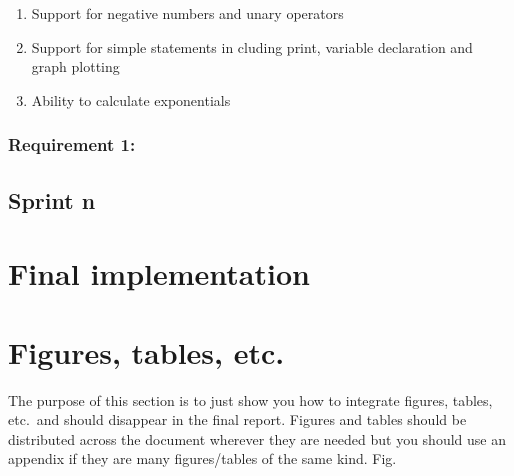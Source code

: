 \documentclass[a4paper, oneside, 11pt]{report}
\begin{document}
\begin{enumerate}
\item Support for negative numbers and unary operators
\item Support for simple statements in cluding print, variable declaration and graph plotting
\item Ability to calculate exponentials
\end{enumerate}

\subsubsection{Requirement 1: }




\subsection{Sprint n}

\section{Final implementation}

\section{Figures, tables, etc.}

The purpose of this section is to just show you how to integrate figures, tables, etc.\ and should disappear in the final report. Figures and tables should be distributed across the document wherever they are needed but you should use an appendix if they are many figures/tables of the same kind. Fig.\ %

\begin{figure}[htb]
\end{figure}


\begin{figure}[htb]
\end{figure}
\end{document}
